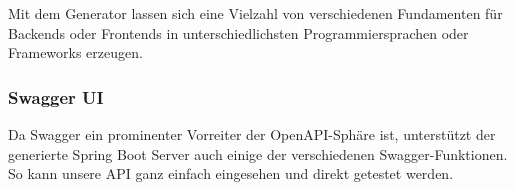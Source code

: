 \documentclass[../main.tex]{subfiles}
\begin{document}
	\noindent Mit dem Generator lassen sich eine Vielzahl von verschiedenen Fundamenten für Backends oder Frontends in unterschiedlichsten Programmiersprachen oder Frameworks erzeugen.
	
	\subsubsection{Swagger UI}
	Da Swagger ein prominenter Vorreiter der OpenAPI-Sphäre ist, unterstützt der generierte Spring Boot Server auch einige der verschiedenen Swagger-Funktionen. So kann unsere API ganz einfach eingesehen und direkt getestet werden.
	
\end{document}
